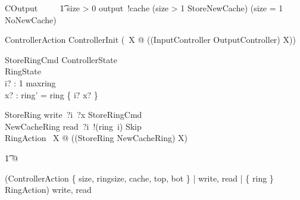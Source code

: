 \begin{circusaction}
    COutput ~~\circdef~~
            \t1 \lcircguard size > 0 \rcircguard \circguard output~!cache \then
            (\lcircguard size > 1 \rcircguard \circguard StoreNewCache)
            \extchoice
            (\lcircguard size = 1 \rcircguard \circguard NoNewCache)
\end{circusaction}




\begin{circusaction}
    ControllerAction \circdef ControllerInit \circseq (\circmu\ X @ ((InputController \extchoice OutputController) \circseq X)) \\
\end{circusaction}


\begin{schema}{StoreRingCmd}
    \Xi ControllerState
    \\%
    \Delta RingState
    \\%
    i? : 1 \upto maxring
    \\%
    x? : \nat
\where
    ring' = ring \oplus \{ i? \mapsto x? \}
\end{schema}

\begin{circusaction}
   StoreRing \circdef write~?i~?x \then StoreRingCmd \\
   NewCacheRing \circdef read~?i~!(ring~i) \then Skip \\
   RingAction \circdef \circmu\ X @ ((StoreRing \extchoice NewCacheRing) \circseq X)
\end{circusaction}

\begin{circusaction}
    \t1 @

   (ControllerAction \lpar
        \{ size, ringsize, cache, top, bot \} |
        \lchanset write, read \rchanset |
        \{ ring \} \rpar
    RingAction) \circhide \lchanset write, read \rchanset
\end{circusaction}

\begin{circus}
    \circend
\end{circus}
